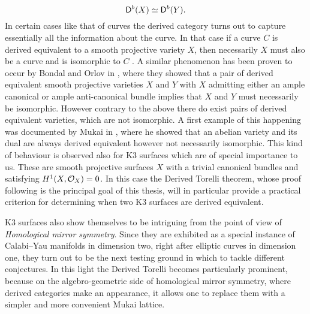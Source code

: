 \[
    \mathsf{D}^b(X) \simeq \mathsf{D}^b(Y). 
\]
In certain cases like that of curves the derived category turns out to capture essentially all the information about the curve. In that case if a curve $C$ is derived equivalent to a smooth projective variety $X$, then necessarily $X$ must also be a curve and is isomorphic to $C$ \cite[\S 5]{huybrechts2006fouriermukai}. A similar phenomenon has been proven to occur by Bondal and Orlov in \cite{BondalOrlov2001}, where they showed that a pair of derived equivalent smooth projective varieties $X$ and $Y$ with $X$ admitting either an ample canonical or ample anti-canonical bundle implies that $X$ and $Y$ must necessarily be isomorphic. However contrary to the above there do exist pairs of derived equivalent varieties, which are not isomorphic. A first example of this happening was documented by Mukai in \cite{Mukai1981}, where he showed that an abelian variety and its dual are always derived equivalent however not necessarily isomorphic. This kind of behaviour is observed also for K3 surfaces which are of special importance to us. These are smooth projective surfaces $X$ with a trivial canonical bundles and satisfying $H^{1}(X, {\mathcal{O}_{X}}) = 0$. In this case the Derived Torelli theorem, whose proof following \cite{Orlov2003} is the principal goal of this thesis, will in particular provide a practical criterion for determining when two K3 surfaces are derived equivalent. 


K3 surfaces also show themselves to be intriguing from the point of view of \emph{Homological mirror symmetry}. Since they are exhibited as a special instance of Calabi--Yau manifolds in dimension two, right after elliptic curves in dimension one, they turn out to be the next testing ground in which to tackle different conjectures. In this light the Derived Torelli becomes particularly prominent, because on the algebro-geometric side of homological mirror symmetry, where derived categories make an appearance, it allows one to replace them with a simpler and more convenient Mukai lattice. 





